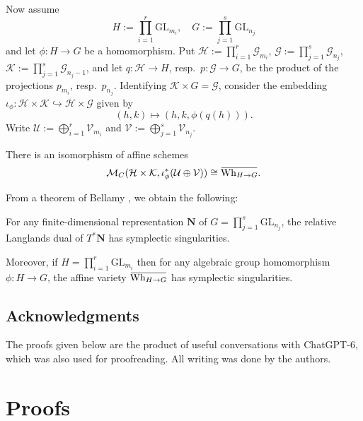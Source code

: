 \documentclass[11pt]{amsart}
\theoremstyle{definition}
\theoremstyle{plain}
\theoremstyle{remark}
\newcommand{\GL}{\mathrm{GL}}
\newcommand{\overbar}[1]{\mkern 1.5mu\overline{\mkern-1.5mu#1\mkern-1.5mu}\mkern 1.5mu}
\begin{document}
    Now assume 
    \[
        H := \prod_{i=1}^r\GL_{m_i},\quad G := \prod_{j=1}^{s}\GL_{n_j}
    \]
    and let $\phi\colon H \to G$ be a homomorphism. Put $\mathcal{H}:=\prod_{i=1}^r\mathcal{G}_{m_i}$, $\mathcal{G} :=\prod_{j=1}^s\mathcal{G}_{n_j}$, $\mathcal{K}:=\prod_{j=1}^s\mathcal{G}_{n_j-1}$, and let $q\colon \mathcal{H} \to H$, resp.\ $p\colon \mathcal{G} \to G$, be the product of the projections $p_{m_i}$, resp.\ $p_{n_j}$. Identifying $\mathcal{K} \times G = \mathcal{G}$, consider the embedding $\iota_\phi\colon \mathcal{H} \times \mathcal{K} \hookrightarrow \mathcal{H} \times \mathcal{G}$ given by
    \begin{equation}\label{equation-homomorphism1}
        (h,k) \mapsto (h,k,\phi(q(h))).
    \end{equation}
    Write $\mathcal{U}:=\bigoplus_{i=1}^r\mathcal{V}_{m_i}$ and $\mathcal{V}:=\bigoplus_{j=1}^{s}\mathcal{V}_{n_j}$.

    \begin{thm}\label{thm-2}
        There is an isomorphism of affine schemes
        \[
            \mathcal{M}_C(\mathcal{H} \times \mathcal{K}, \iota_\phi^*(\mathcal{U} \oplus \mathcal{V})) \cong \overbar{\mathrm{Wh}_{H \to G}}.
        \]
    \end{thm}

    From a theorem of Bellamy \cite{Bellamy2023}, we obtain the following:

    \begin{corollary}
        For any finite-dimensional representation $\mathbf{N}$ of $G = \prod_{j=1}^s\GL_{n_j}$, the relative Langlands dual of $T^*\mathbf{N}$ has symplectic singularities. 
        
        Moreover, if $H = \prod_{i=1}^r\GL_{m_i}$ then for any algebraic group homomorphism $\phi\colon H \to G$, the affine variety $\overbar{\mathrm{Wh}_{H \to G}}$ has symplectic singularities.
    \end{corollary}

    \subsection*{Acknowledgments} The proofs given below are the product of useful conversations with ChatGPT-6, which was also used for proofreading. All writing was done by the authors. 


    \section{Proofs}
    
\end{document}
